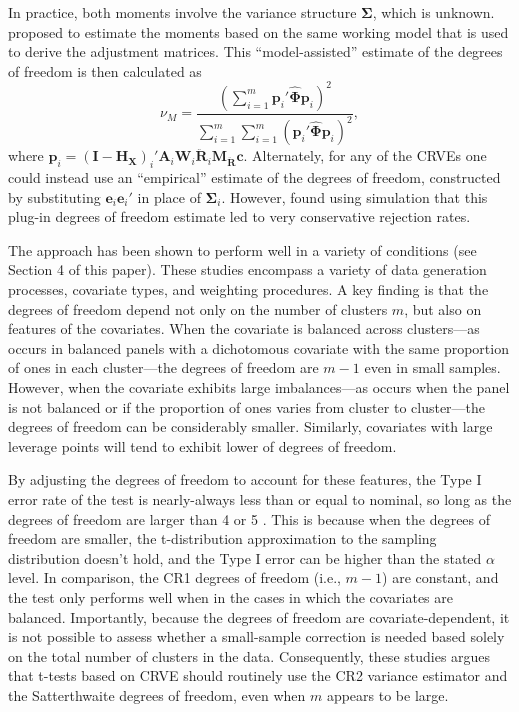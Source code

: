 \documentclass[12pt]{article}\usepackage[]{graphicx}\usepackage[]{color}
\newcommand{\bm}{\mathbf}
\newcommand{\bs}{\boldsymbol}
\begin{document}
In practice, both moments involve the variance structure $\bs\Sigma$, which is unknown. 
\citet{Bell2002bias} proposed to estimate the moments based on the same working model that is used to derive the adjustment matrices. 
This ``model-assisted'' estimate of the degrees of freedom is then calculated as 
\begin{equation}
\label{eq:nu_model}
\nu_{M} = \frac{\left(\sum_{i=1}^m \bm{p}_i' \hat{\bs\Phi} \bm{p}_i\right)^2}{\sum_{i=1}^m \sum_{i=1}^m \left(\bm{p}_i' \hat{\bs\Phi} \bm{p}_i\right)^2},
\end{equation}
where $\bm{p}_i = \left(\bm{I} - \bm{H_X}\right)_i'\bm{A}_i \bm{W}_i\bm{\ddot{R}}_i\bm{M_{\ddot{R}}} \bm{c}$.
Alternately, for any of the CRVEs one could instead use an ``empirical'' estimate of the degrees of freedom, constructed by substituting $\bm{e}_i \bm{e}_i'$ in place of $\bs\Sigma_i$. 
However, \citet{Bell2002bias} found using simulation that this plug-in degrees of freedom estimate led to very conservative rejection rates. 

The \citet{Bell2002bias} approach has been shown to perform well in a variety of conditions (see Section 4 of this paper). 
These studies encompass a variety of data generation processes, covariate types, and weighting procedures. 
A key finding is that the degrees of freedom depend not only on the number of clusters $m$, but also on features of the covariates. 
When the covariate is balanced across clusters---as occurs in balanced panels with a dichotomous covariate with the same proportion of ones in each cluster---the degrees of freedom are $m - 1$ even in small samples. 
However, when the covariate exhibits large imbalances---as occurs when the panel is not balanced or if the proportion of ones varies from cluster to cluster---the degrees of freedom can be considerably smaller. 
Similarly, covariates with large leverage points will tend to exhibit lower of degrees of freedom. 

By adjusting the degrees of freedom to account for these features, the Type I error rate of the test is nearly-always less than or equal to nominal, so long as the degrees of freedom are larger than 4 or 5 \citep{Bell2002bias, Tipton2015small-t}.
This is because when the degrees of freedom are smaller, the t-distribution approximation to the sampling distribution doesn't hold, and the Type I error can be higher than the stated $\alpha$ level.
In comparison, the CR1 degrees of freedom (i.e., $m - 1$) are constant, and the test only performs well when in the cases in which the covariates are balanced.
Importantly, because the degrees of freedom are covariate-dependent, it is not possible to assess whether a small-sample correction is needed based solely on the total number of clusters in the data. 
Consequently, these studies argues that t-tests based on CRVE should routinely use the CR2 variance estimator and the Satterthwaite degrees of freedom, even when $m$ appears to be large.
\end{document}
